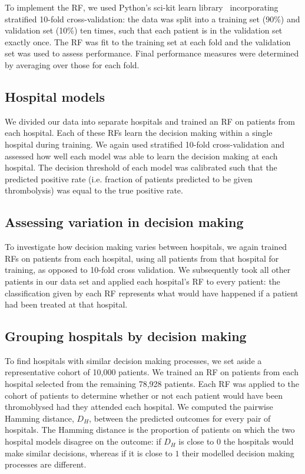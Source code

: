 \documentclass[12pt,a4paper, pdftex]{elsarticle}
\begin{document}
To implement the RF, we used Python's sci-kit learn library~\cite{pedregosa2011scikit} incorporating stratified 10-fold cross-validation: the data was split into a training set (90\%) and validation set (10\%) ten times, such that each patient is in the validation set exactly once. The RF was fit to the training set at each fold and the validation set was used to assess performance. Final performance measures were determined by averaging over those for each fold.

\subsection{Hospital models}

We divided our data into separate hospitals and trained an RF on patients from each hospital. Each of these RFs learn the decision making within a single hospital during training. We again used stratified 10-fold cross-validation and assessed how well each model was able to learn the decision making at each hospital. The decision threshold of each model was calibrated such that the predicted positive rate (i.e. fraction of patients predicted to be given thrombolysis) was equal to the true positive rate.


\subsection{Assessing variation in decision making}

To investigate how decision making varies between hospitals, we again trained RFs on patients from each hospital, using all patients from that hospital for training, as opposed to 10-fold cross validation. We subsequently took all other patients in our data set and applied each hospital's RF to every patient: the classification given by each RF represents what would have happened if a patient had been treated at that hospital.

\subsection{Grouping hospitals by decision making}

To find hospitals with similar decision making processes, we set aside a representative cohort of 10,000 patients. We trained an RF on patients from each hospital selected from the remaining 78,928 patients. Each RF was applied to the cohort of patients to determine whether or not each patient would have been thromoblysed had they attended each hospital. We computed the pairwise Hamming distance, $D_H$, between the predicted outcomes for every pair of hospitals.  The Hamming distance is the proportion of patients on which the two hospital models disagree on the outcome: if $D_H$ is close to $0$ the hospitals would make similar decisions, whereas if it is close to $1$ their modelled decision making processes are different.
\end{document}
